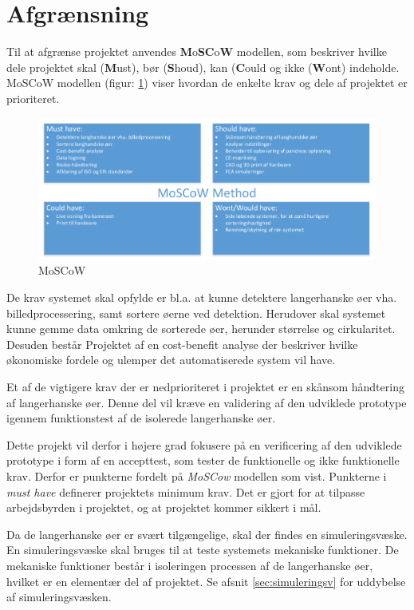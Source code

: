 \newpage
\section{Afgrænsning}
Til at afgrænse projektet anvendes \textbf{M}o\textbf{SC}o\textbf{W} modellen, som beskriver hvilke dele projektet skal (\textbf{M}ust), bør (\textbf{S}houd), kan (\textbf{C}ould og ikke (\textbf{W}ont) indeholde. MoSCoW modellen (figur: \ref{fig:moscow}) viser hvordan de enkelte krav og dele af projektet er prioriteret. 


\begin{figure}[H]
	\centering
	\includegraphics[width=1\textwidth]{billeder/MoSCoW-crop.pdf}
	\caption{MoSCoW}
	\label{fig:moscow}
\end{figure}

De krav systemet skal opfylde er bl.a. at kunne detektere langerhanske øer vha. billedprocessering, samt sortere øerne ved detektion. Herudover skal systemet kunne gemme data omkring de sorterede øer, herunder størrelse og cirkularitet. Desuden består Projektet af en cost-benefit analyse der beskriver hvilke økonomiske fordele og ulemper det automatiserede system vil have. 

Et af de vigtigere krav der er nedprioriteret i projektet er en skånsom håndtering af langerhanske øer. Denne del vil kræve en validering af den udviklede prototype igennem funktionstest af de isolerede langerhanske øer. %

Dette projekt vil derfor i højere grad fokusere på en verificering af den udviklede prototype i form af en accepttest, som tester de funktionelle og ikke funktionelle krav. Derfor er punkterne  fordelt på \textit{MoSCow} modellen som vist. Punkterne i \textit{must have} definerer projektets minimum krav. Det er gjort for at tilpasse arbejdsbyrden i projektet, og at projektet kommer sikkert i mål.

Da de langerhanske øer er svært tilgængelige, skal der findes en simuleringsvæske. En simuleringsvæske skal bruges til at teste systemets mekaniske funktioner. De mekaniske funktioner består i isoleringen processen af de langerhanske øer, hvilket er en elementær del af projektet. Se afsnit \ref{sec:simuleringsv} for uddybelse af simuleringsvæsken.

